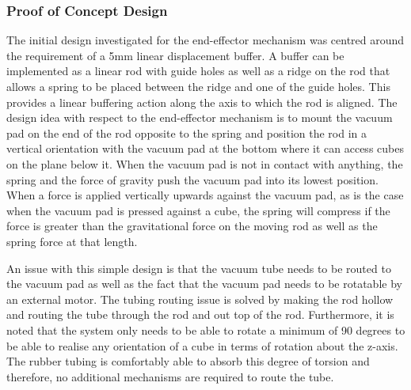 \subsubsection{Proof of Concept Design}

The initial design investigated for the end-effector mechanism was centred around the requirement of a 5mm linear displacement buffer. A buffer can be implemented as a linear rod with guide holes as well as a ridge on the rod that allows a spring to be placed between the ridge and one of the guide holes. This provides a linear buffering action along the axis to which the rod is aligned. The design idea with respect to the end-effector mechanism is to mount the vacuum pad on the end of the rod opposite to the spring and position the rod in a vertical orientation with the vacuum pad at the bottom where it can access cubes on the plane below it. When the vacuum pad is not in contact with anything, the spring and the force of gravity push the vacuum pad into its lowest position. When a force is applied vertically upwards against the vacuum pad, as is the case when the vacuum pad is pressed against a cube, the spring will compress if the force is greater than the gravitational force on the moving rod as well as the spring force at that length.

An issue with this simple design is that the vacuum tube needs to be routed to the vacuum pad as well as the fact that the vacuum pad needs to be rotatable by an external motor. The tubing routing issue is solved by making the rod hollow and routing the tube through the rod and out top of the rod. Furthermore, it is noted that the system only needs to be able to rotate a minimum of 90 degrees to be able to realise any orientation of a cube in terms of rotation about the z-axis. The rubber tubing is comfortably able to absorb this degree of torsion and therefore, no additional mechanisms are required to route the tube.

